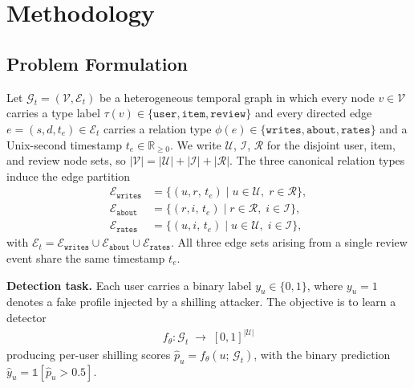 ﻿%

\section{Methodology}
\label{sec:method}

\subsection{Problem Formulation}
\label{sec:formulation}

Let $\mathcal{G}_t = (\mathcal{V}, \mathcal{E}_t)$ be a heterogeneous temporal
graph in which every node $v \in \mathcal{V}$ carries a type label
$\tau(v) \in \{\texttt{user}, \texttt{item}, \texttt{review}\}$ and every
directed edge $e = (s, d, t_e) \in \mathcal{E}_t$ carries a relation type
$\phi(e) \in \{\texttt{writes}, \texttt{about}, \texttt{rates}\}$ and a
Unix-second timestamp $t_e \in \mathbb{R}_{\geq 0}$.
We write $\mathcal{U}$, $\mathcal{I}$, $\mathcal{R}$ for the disjoint user,
item, and review node sets, so
$|\mathcal{V}| = |\mathcal{U}| + |\mathcal{I}| + |\mathcal{R}|$.
The three canonical relation types induce the edge partition
\begin{align}
  \mathcal{E}_{\texttt{writes}}
    &= \{(u, r,\, t_e) \mid u \in \mathcal{U},\; r \in \mathcal{R}\},
    \label{eq:ewrites} \\
  \mathcal{E}_{\texttt{about}}
    &= \{(r, i,\, t_e) \mid r \in \mathcal{R},\; i \in \mathcal{I}\},
    \label{eq:eabout} \\
  \mathcal{E}_{\texttt{rates}}
    &= \{(u, i,\, t_e) \mid u \in \mathcal{U},\; i \in \mathcal{I}\},
    \label{eq:erates}
\end{align}
with $\mathcal{E}_t =
  \mathcal{E}_{\texttt{writes}} \cup
  \mathcal{E}_{\texttt{about}}  \cup
  \mathcal{E}_{\texttt{rates}}$.
All three edge sets arising from a single review event share the same timestamp
$t_e$.

\textbf{Detection task.}
Each user carries a binary label $y_u \in \{0, 1\}$, where $y_u = 1$ denotes a
fake profile injected by a shilling attacker.
The objective is to learn a detector
\begin{align}
  f_\theta : \mathcal{G}_t \;\longrightarrow\; [0,1]^{|\mathcal{U}|}
  \label{eq:task}
\end{align}
producing per-user shilling scores $\hat{p}_u = f_\theta(u;\, \mathcal{G}_t)$,
with the binary prediction $\hat{y}_u = \mathbb{1}[\hat{p}_u > 0.5]$.

